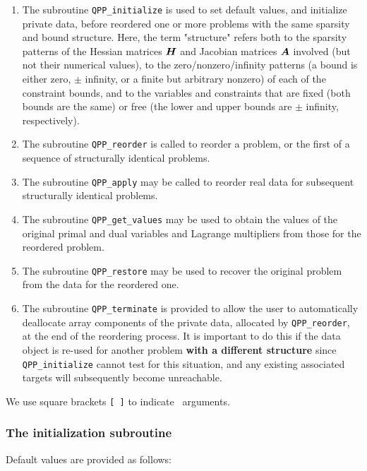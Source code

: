 \documentclass{galahad}
\newcommand{\packagename}{QPP}
\begin{document}
\begin{enumerate}
\item The subroutine 
  {\tt \packagename\_initialize} 
  is used to set default 
  values, and initialize private data, before reordered one or more problems 
  with the same sparsity and bound structure. 
  Here, the term "structure" refers both to 
  the sparsity patterns of the Hessian matrices ${\bm{H}}$ and Jacobian 
  matrices ${\bm{A}}$ involved 
  (but not their numerical values), to the zero/nonzero/infinity patterns 
  (a bound is either zero, $\pm$ infinity, or a finite but arbitrary 
  nonzero) of each of the constraint bounds, and to the variables and 
  constraints that are fixed (both bounds are the same) or free 
  (the lower and upper bounds are $\pm$ infinity, respectively). 
 
\item The subroutine 
  {\tt \packagename\_reorder} 
  is called to reorder a problem, or the first of a sequence of structurally 
  identical problems. 
 
\item The subroutine 
  {\tt \packagename\_apply} 
  may be called to reorder real data for subsequent structurally identical 
  problems. 
 
\item The subroutine 
  {\tt \packagename\_get\_values} 
  may be used to obtain the values of the original primal and dual variables 
  and Lagrange multipliers from those for the reordered problem. 
 
\item The subroutine {\tt \packagename\_restore} may be used to recover the 
  original problem from the data for the reordered one. 
 
\item The subroutine 
  {\tt \packagename\_terminate} 
  is provided to allow the user to automatically deallocate array components 
  of the private data,  allocated by 
  {\tt \packagename\_reorder}, 
  at the end of the reordering process. It is important to do this if the data 
  object is re-used for another problem {\bf with a different structure} 
  since {\tt \packagename\_initialize} cannot test for this situation, 
  and any existing associated targets will subsequently become unreachable. 
\end{enumerate}
We use square brackets {\tt [ ]} to indicate \optional\ arguments.


\subsubsection{The initialization subroutine}\label{subinit}
 Default values are provided as follows:
\vspace*{1mm}
\end{document}

